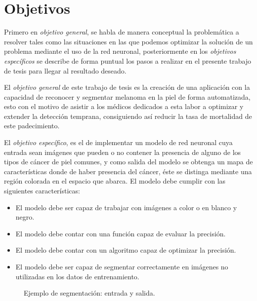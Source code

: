\section{Objetivos}
Primero en \emph{objetivo general}, se habla de manera conceptual la problemática a resolver tales como las situaciones en las que podemos optimizar la solución de un problema mediante el uso de la red neuronal, posteriormente en los \emph{objetivos específicos} se describe de forma puntual los pasos a realizar en el presente trabajo de tesis para llegar al resultado deseado.

El \emph{objetivo general} de este trabajo de tesis es la creación de una aplicación con la capacidad de reconocer y segmentar melanoma en la piel de forma automatizada, esto con el motivo de asistir a los médicos dedicados a esta labor a optimizar y extender la detección temprana, consiguiendo así reducir la tasa de mortalidad de este padecimiento.

El \emph{objetivo específico}, es el de implementar un modelo de red neuronal cuya entrada sean imágenes que pueden o no contener la presencia de alguno de los tipos de cáncer de piel comunes, y como salida del modelo se obtenga un mapa de características donde de haber presencia del cáncer, éste se distinga mediante una región colorada en el espacio que abarca. El modelo debe cumplir con las siguientes características:

\begin{itemize}
    \item El modelo debe ser capaz de trabajar con imágenes a color o en blanco y negro.
    \item El modelo debe contar con una función capaz de evaluar la precisión.
    \item El modelo debe contar con un algoritmo capaz de optimizar la precisión.
    \item El modelo debe ser capaz de segmentar correctamente en imágenes no utilizadas en los datos de entrenamiento.
\end{itemize}

\begin{figure}[!htp]
    \centering
    \qquad
    \caption{Ejemplo de segmentación: entrada y salida.}
    \label{data_1}
\end{figure}

